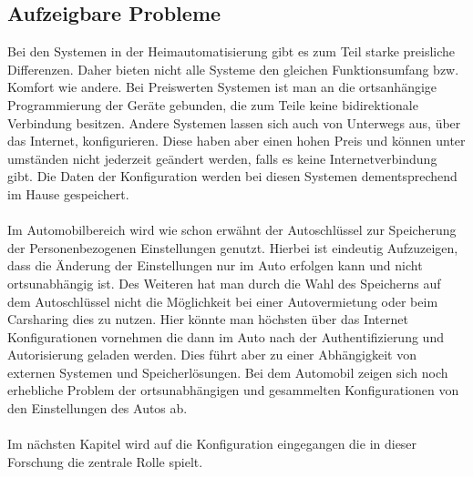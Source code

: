 \subsection{Aufzeigbare Probleme}
Bei den Systemen in der Heimautomatisierung gibt es zum Teil starke preisliche Differenzen. Daher bieten nicht alle Systeme den gleichen Funktionsumfang bzw. Komfort wie andere. 
Bei Preiswerten Systemen ist man an die ortsanhängige Programmierung der Geräte gebunden, die zum Teile keine bidirektionale Verbindung besitzen. Andere Systemen lassen sich auch von Unterwegs aus, über das Internet, konfigurieren. Diese haben aber einen hohen Preis und können unter umständen nicht jederzeit geändert werden, falls es keine Internetverbindung gibt. Die Daten der Konfiguration werden bei diesen Systemen dementsprechend im Hause gespeichert. 
\\\\
Im Automobilbereich wird wie schon erwähnt der Autoschlüssel zur Speicherung der Personenbezogenen Einstellungen genutzt. Hierbei ist eindeutig Aufzuzeigen, dass die Änderung der Einstellungen nur im Auto erfolgen kann und nicht ortsunabhängig ist. Des Weiteren hat man durch die Wahl des Speicherns auf dem Autoschlüssel nicht die Möglichkeit bei einer Autovermietung oder beim Carsharing dies zu nutzen. Hier könnte man höchsten über das Internet Konfigurationen vornehmen die dann im Auto nach der Authentifizierung und Autorisierung geladen werden.
Dies führt aber zu einer Abhängigkeit von externen Systemen und Speicherlösungen. Bei dem Automobil zeigen sich noch erhebliche Problem der ortsunabhängigen und gesammelten Konfigurationen von den Einstellungen des Autos ab. 
\\\\
Im nächsten Kapitel wird auf die Konfiguration eingegangen die in dieser Forschung die zentrale Rolle spielt.

